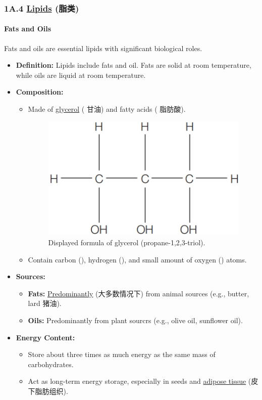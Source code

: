 
\subsubsection{1A.4 \underline{Lipids} (脂类)}
\paragraph{Fats and Oils} Fats and oils are essential lipids with significant biological roles.
\begin{itemize}
    \item \textbf{Definition:} Lipids include fats and oil. Fats are solid at room temperature, while oils are liquid at room
    temperature.
    \item \textbf{Composition:}
    \begin{itemize}
        \item Made of \underline{glycerol} ( 甘油) and fatty acids ( 脂肪酸).
        \begin{figure}[H]
            \centering
            \includegraphics[scale=0.28]{Biology/1A/Images/1A-4-1.png}
            \caption{Displayed formula of glycerol (propane-1,2,3-triol).}
        \end{figure}
        \item Contain carbon (), hydrogen (), and small amount of oxygen () atoms.
    \end{itemize}
    \item \textbf{Sources:}
    \begin{itemize}
        \item \textbf{Fats:} \underline{Predominantly} (大多数情况下) from animal sources (e.g., butter, lard 猪油).
        \item \textbf{Oils:} Predominantly from plant sourcrs (e.g., olive oil, sunflower oil).
    \end{itemize}
    \item \textbf{Energy Content:}
    \begin{itemize}
        \item Store about three times as much energy as the same mass of carbohydrates.
        \item Act as long-term energy storage, especially in seeds and \underline{adipose tissue} (皮下脂肪组织).
    \end{itemize}
\end{itemize}

